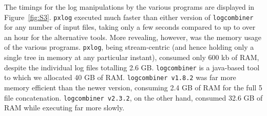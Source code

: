 \documentclass{article}
\begin{document}
The timings for the log manipulations by the various programs are displayed in Figure~\ref{fig:S3}. \texttt{pxlog} executed much faster than either version of \texttt{logcombiner} for any number of input files, taking only a few seconds compared to up to over an hour for the alternative tools. More revealing, however, was the memory usage of the various programs. \texttt{pxlog}, being stream-centric (and hence holding only a single tree in memory at any particular instant), consumed only 600 kb of RAM, despite the individual log files totalling 2.6 GB. \texttt{logcombiner} is a java-based tool to which we allocated 40 GB of RAM. \texttt{logcombiner v1.8.2} was far more memory efficient than the newer version, consuming 2.4 GB of RAM for the full 5 file concatenation. \texttt{logcombiner v2.3.2}, on the other hand, consumed 32.6 GB of RAM while executing far more slowly.

%
%
%
%
%
%
%

\end{document}
